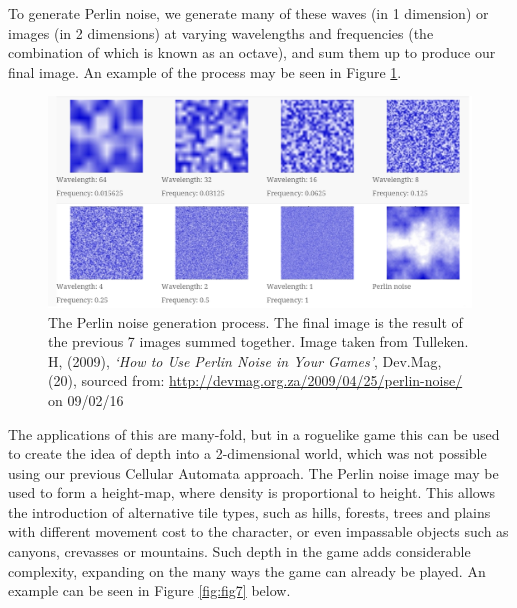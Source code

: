 \documentclass[12pt,a4paper]{article}
\begin{document}
To generate Perlin noise, we generate many of these waves (in 1 dimension) or images (in 2 dimensions) at varying wavelengths and frequencies (the combination of which is known as an octave), and sum them up to produce our final image. An example of the process may be seen in Figure \ref{fig:fig6}.

\begin{figure}[h!]
  \centering
 	\includegraphics[scale=0.55]{images/perlingen.png}
	\caption[]{The Perlin noise generation process. The final image is the result of the previous 7 images summed together. Image taken from Tulleken. H, (2009), \emph{`How to Use Perlin Noise in Your Games'}, Dev.Mag, (20), sourced from: \url{http://devmag.org.za/2009/04/25/perlin-noise/} on 09/02/16}
	\label{fig:fig6}
\end{figure}

The applications of this are many-fold, but in a roguelike game this can be used to create the idea of depth into a 2-dimensional world, which was not possible using our previous Cellular Automata approach. The Perlin noise image may be used to form a height-map, where density is proportional to height. This allows the introduction of alternative tile types, such as hills, forests, trees and plains with different movement cost to the character, or even impassable objects such as canyons, crevasses or mountains. Such depth in the game adds considerable complexity, expanding on the many ways the game can already be played. An example can be seen in Figure \ref{fig:fig7} below.
\end{document}
